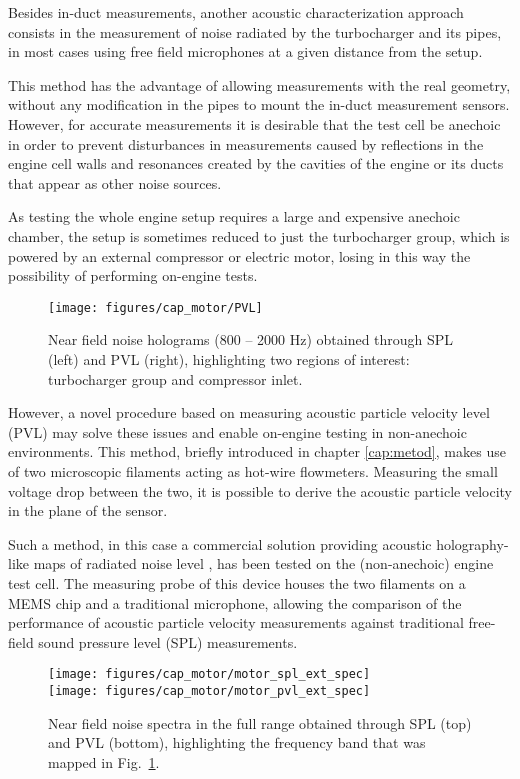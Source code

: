 Besides in-duct measurements, another acoustic characterization approach consists in the measurement of noise radiated by the turbocharger and its pipes, in most cases using free field microphones at a given distance from the setup.

This method has the advantage of allowing measurements with the real geometry, without any modification in the pipes to mount the in-duct measurement sensors. However, for accurate measurements it is desirable that the test cell be anechoic in order to prevent disturbances in measurements caused by reflections in the engine cell walls and resonances created by the cavities of the engine or its ducts that appear as other noise sources.

As testing the whole engine setup requires a large and expensive anechoic chamber, the setup is sometimes reduced to just the turbocharger group, which is powered by an external compressor or electric motor, losing in this way the possibility of performing on-engine tests.

\begin{figure}[b!]
\centering
\texttt{[image: figures/cap\_motor/PVL]}
\caption[Near field noise holograms (800 -- 2000 Hz)]{Near field noise holograms (800 -- 2000 Hz) obtained through SPL (left) and PVL (right), highlighting two regions of interest: turbocharger group  and compressor inlet.}
\label{fig:PVL}
\end{figure}

However, a novel procedure based on measuring acoustic particle velocity level (PVL) may solve these issues \cite{jacobsen2005comp} and enable on-engine testing in non-anechoic environments. This method, briefly introduced in chapter \ref{cap:metod}, makes use of two microscopic filaments acting as hot-wire flowmeters. Measuring the small voltage drop between the two, it is possible to derive the acoustic particle velocity in the plane of the sensor.

Such a method, in this case a commercial solution providing acoustic holography-like maps of radiated noise level \cite{comesana2013scan}, has been tested on the (non-anechoic) engine test cell. The measuring probe of this device houses the two filaments on a MEMS chip and a traditional microphone, allowing the comparison of the performance of acoustic particle velocity measurements against traditional free-field sound pressure level (SPL) measurements.

\begin{figure}[tb!]
\centering
\texttt{[image: figures/cap\_motor/motor\_spl\_ext\_spec]}\\[5mm]
\texttt{[image: figures/cap\_motor/motor\_pvl\_ext\_spec]}
\caption[Near field noise spectra in the full range]{Near field noise spectra in the full range obtained through SPL (top) and PVL (bottom), highlighting the frequency band that was mapped in Fig.~\ref{fig:PVL}.}
\label{fig:PVL_spec_ext}
\end{figure}


